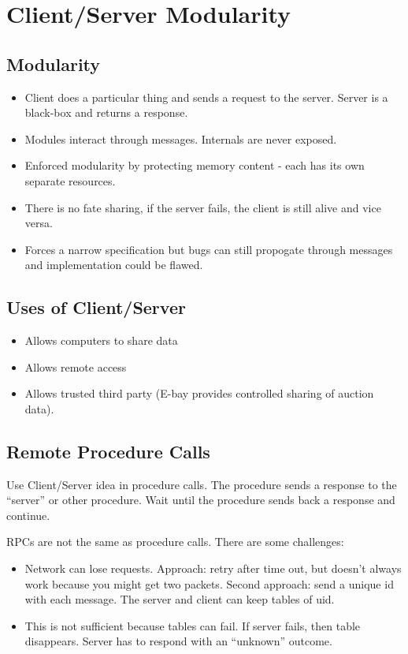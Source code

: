 \documentclass[psamsfonts]{amsart}
\begin{document}
\section{Client/Server Modularity}

\subsection{Modularity}

\begin{itemize}

\item Client does a particular thing and sends a request to the server. Server is a black-box and returns a response.
\item Modules interact through messages. Internals are never exposed. 
\item Enforced modularity by protecting memory content - each has its own separate resources.
\item There is no fate sharing, if the server fails, the client is still alive and vice versa.
\item Forces a narrow specification but bugs can still propogate through messages and implementation could be flawed. 
\end{itemize}

\subsection{Uses of Client/Server}

\begin{itemize}
\item Allows computers to share data
\item Allows remote access
\item Allows trusted third party (E-bay provides controlled sharing of auction data).
\end{itemize}

\subsection{Remote Procedure Calls}

Use Client/Server idea in procedure calls. The procedure sends a response to the ``server'' or other procedure. Wait until the procedure sends back a response and continue.

RPCs are not the same as procedure calls. There are some challenges:

\begin{itemize}
\item Network can lose requests. Approach: retry after time out, but doesn't always work because you might get two packets. Second approach: send a unique id with each message. The server and client can keep tables of uid.  
\item This is not sufficient because tables can fail. If server fails, then table disappears. Server has to respond with an ``unknown'' outcome. 
\end{itemize}
\end{document}
